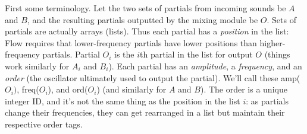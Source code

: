 \documentclass{article}
\newcommand\name{Flow}
\begin{document}
First some terminology.  Let the two sets of partials from incoming sounds be \(A\) and \(B\), and the resulting partials outputted by the mixing module be \(O\).   Sets of partials are actually arrays (lists).  Thus each partial has a {\it position} in the list: {\name} requires that lower-frequency partials have lower positions than higher-frequency partials.  Partial \(O_i\) is the \(i\)th partial in the list for output \(O\) (things work similarly for \(A_i\) and \(B_i\)).  Each partial has an {\it amplitude}, a {\it frequency}, and an {\it order} (the oscillator ultimately used to output the partial).  We'll call these amp(\(O_i)\), freq(\(O_i\)), and ord(\(O_i\)) (and similarly for \(A\) and \(B\)).  The order is a unique integer ID, and it's not the same thing as the position in the list \(i\): as partials change their frequencies, they can get rearranged in a list but maintain their respective order tags.
\end{document}
